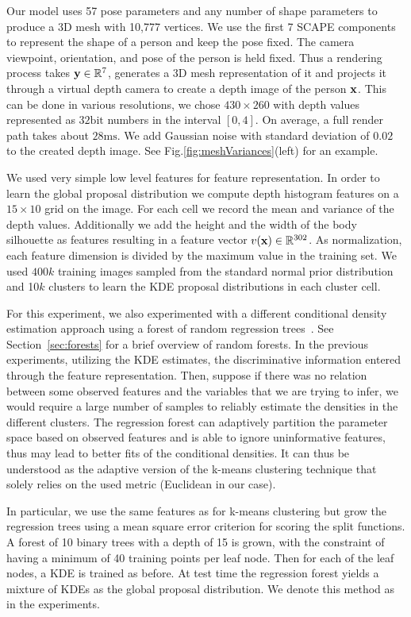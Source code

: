 Our model uses 57 pose parameters and any number of shape parameters
to produce a 3D mesh with 10,777 vertices. We use the first 7 SCAPE
components to represent the shape of a person and keep the pose fixed.
The camera viewpoint, orientation, and pose of the person is held fixed. Thus a
rendering process takes $\mathbf{y}\in\mathbb{R}^7$, generates a 3D mesh
representation of it and projects it through a virtual depth camera to
create a depth image of the person $\mathbf{x}$. This can be done in various
resolutions, we chose $430\times 260$ with depth values represented as
$32\textrm{bit}$ numbers in the interval $[0,4]$. On average, a full render path takes about
$28\textrm{ms}$. We add Gaussian noise with standard
deviation of $0.02$ to the created depth image. See
Fig.\ref{fig:meshVariances}(left) for an example.

We used very simple low level features for feature representation. In
order to learn the global proposal distribution we compute depth
histogram features on a $15\times 10$ grid on the image. For each cell
we record the mean and variance of the depth values. Additionally we
add the height and the width of the body silhouette as features
resulting in a feature vector $v(\mathbf{x})\in\mathbb{R}^{302}$. As
normalization, each feature dimension is divided by the maximum value
in the training set. We used $400k$ training images sampled from the
standard normal prior distribution and 10$k$ clusters to learn the KDE
proposal distributions in each cluster cell.

For this experiment, we also experimented with a different conditional
density estimation approach using a forest of random regression
trees~\cite{breiman1984cart,breiman2001random}.
See Section~\ref{sec:forests} for a brief overview of random forests.
In the previous experiments, utilizing the KDE estimates, the
discriminative information entered through the feature representation.
Then, suppose if there was no relation between some observed features and the
variables that we are trying to infer, we would require a large number
of samples to reliably estimate the densities in the different
clusters. The regression forest can adaptively partition the parameter
space based on observed features and is able to ignore uninformative features, thus may lead to better
fits of the conditional densities. It can thus be understood as the
adaptive version of the k-means clustering technique that solely
relies on the used metric (Euclidean in our case).

In particular, we use the same features as for k-means clustering but
grow the regression trees using a mean square error criterion for
scoring the split functions. A forest of 10 binary trees with a depth
of 15 is grown, with the constraint of having a minimum of 40 training
points per leaf node. Then for each of the leaf nodes, a KDE is
trained as before. At test time the regression forest yields a mixture
of KDEs as the global proposal distribution. We denote this method as
\MIXLMHRF in the experiments.

